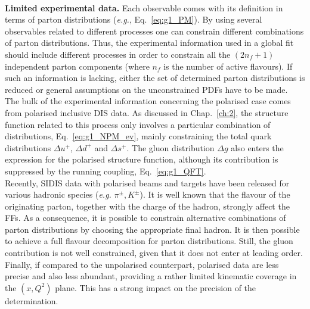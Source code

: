 \endgroup
\\[10pt]
\begingroup
\textbf{Limited experimental data.} Each observable comes with its definition in terms of parton distributions (\textit{e.g.}, Eq.~\eqref{eq:g1_PM}). By using several observables related to different processes one can constrain different combinations of parton distributions. Thus, the experimental information used in a global fit should include different processes in order to constrain all the $(2 n_f + 1)$ independent parton components (where $n_f$ is the number of active flavours). If such an information is lacking, either the set of determined parton distributions is reduced or general assumptions on the unconstrained PDFs have to be made.
\\[6pt]
The bulk of the experimental information concerning the polarised case comes from polarised inclusive DIS data. As discussed in Chap.~\eqref{ch:2}, the structure function related to this process only involves a particular combination of distributions, Eq.~\ref{eq:g1_NPM_ev}, mainly constraining the total quark distributions $\Delta u^{+}$, $\Delta d^{+}$ and $\Delta s^{+}$. The gluon distribution $\Delta g$ also enters the expression for the polarised structure function, although its contribution is suppressed by the running coupling, Eq.~\eqref{eq:g1_QFT}.
\\[6pt]
Recently, SIDIS data with polarised beams and targets have been released for various hadronic species (\textit{e.g.} $\pi^{\pm},K^{\pm}$). It is well known that the flavour of the originating parton, together with the charge of the hadron, strongly affect the FFs. As a consequence, it is possible to constrain alternative combinations of parton distributions by choosing the appropriate final hadron. It is then possible to achieve a full flavour decomposition for parton distributions. Still, the gluon contribution is not well constrained, given that it does not enter at leading order.
\\[6pt]
Finally, if compared to the unpolarised counterpart, polarised data are less precise and also less abundant, providing a rather limited kinematic coverage in the $(x,Q^2)$ plane. This has a strong impact on the precision of the determination.
\endgroup
\\[10pt]
\begingroup
